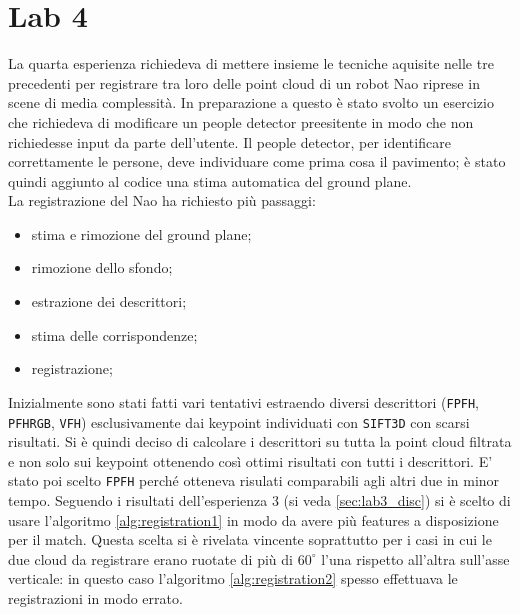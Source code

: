 \documentclass[a4paper]{article}
\begin{document}
\section{Lab 4} \label{sec:lab4}
La quarta esperienza richiedeva di mettere insieme le tecniche aquisite nelle tre precedenti per registrare tra loro delle point cloud di un robot Nao riprese in scene di media complessità. In preparazione a questo è stato svolto un esercizio che richiedeva di modificare un people detector preesitente in modo che non richiedesse input da parte dell'utente. Il people detector, per identificare correttamente le persone, deve individuare come prima cosa il pavimento; è stato quindi aggiunto al codice una stima automatica del ground plane.\\

La registrazione del Nao ha richiesto più passaggi:
\begin{itemize}
	\item stima e rimozione del ground plane;
	\item rimozione dello sfondo;
	\item estrazione dei descrittori;
	\item stima delle corrispondenze;
	\item registrazione;
\end{itemize}
Inizialmente sono stati fatti vari tentativi estraendo diversi descrittori (\verb|FPFH|, \verb|PFHRGB|, \verb|VFH|) esclusivamente dai keypoint individuati con \verb|SIFT3D| con scarsi risultati. Si è quindi deciso di calcolare i descrittori su tutta la point cloud filtrata e non solo sui keypoint ottenendo così ottimi risultati con tutti i descrittori. E' stato poi scelto \verb|FPFH| perché otteneva risulati comparabili agli altri due in minor tempo. Seguendo i risultati dell'esperienza 3 (si veda \ref{sec:lab3_disc}) si è scelto di usare l'algoritmo \ref{alg:registration1} in modo da avere più features a disposizione per il match. Questa scelta si è rivelata vincente soprattutto per i casi in cui le due cloud da registrare erano ruotate di più di $60^\circ$ l'una rispetto all'altra sull'asse verticale: in questo caso l'algoritmo \ref{alg:registration2} spesso effettuava le registrazioni in modo errato.
\end{document}
